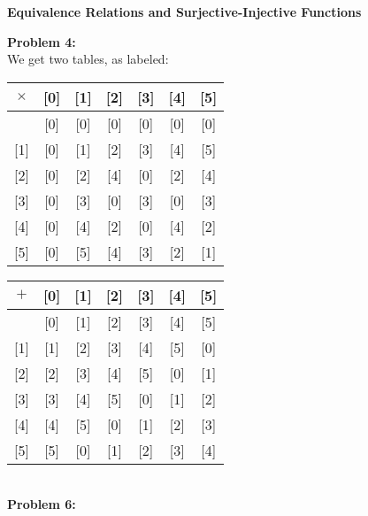 \documentclass[12pt]{article}
\begin{document}
\begin{center} 
\Large
\textbf{Equivalence Relations and Surjective-Injective Functions}
\end{center}

\noindent
\textbf{Problem 4:} \\

\noindent
We get two tables, as labeled:

\begin{center}	
\begin{tabular}{c| c c c c c c}
 	$\times$  & [0] & [1] &[2]  & [3] & [4] & [5] \\
	
	\hline
	[0] & [0]& [0]& [0]& [0]& [0]& [0]\\

	[1] & [0]& [1]& [2]& [3]& [4]& [5]\\
	
	[2] & [0]& [2]& [4]& [0]& [2]& [4]\\
	
	[3] & [0]& [3]& [0]& [3]& [0]& [3]\\
	
	[4] & [0]& [4]& [2]& [0]& [4]& [2]\\
	
	[5] & [0]& [5]& [4]& [3]& [2]& [1] 
\end{tabular}
\end{center}

\begin{center}	
\begin{tabular}{c| c c c c c c}
 	$+$  & [0] & [1] &[2]  & [3] & [4] & [5] \\
	
	\hline
	[0] & [0]& [1]& [2]& [3]& [4]& [5]\\

	[1] & [1]& [2]& [3]& [4]& [5]& [0]\\
	
	[2] & [2]& [3]& [4]& [5]& [0]& [1]\\
	
	[3] & [3]& [4]& [5]& [0]& [1]& [2]\\
	
	[4] & [4]& [5]& [0]& [1]& [2]& [3]\\
	
	[5] & [5]& [0]& [1]& [2]& [3]& [4] 
\end{tabular}
\end{center} \\

\noindent
\textbf{Problem 6: }\\
\end{document}
